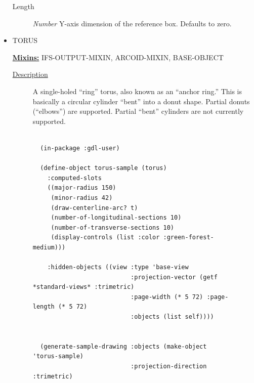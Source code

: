\documentclass [11pt]{book}
\begin{document}
\begin{itemize}
\begin{description}

\item [Length]
\emph{Number} Y-axis dimension of the reference box. Defaults to zero.


\end{description}







\item {}TORUS


\textbf{
\underline{Mixins:}} IFS-OUTPUT-MIXIN, ARCOID-MIXIN, BASE-OBJECT





\begin{description}

\item [
\underline{Description}]


A single-holed ``ring'' torus, also known as an ``anchor ring.''
This is basically a circular cylinder ``bent'' into a donut shape. Partial donuts (``elbows'') are supported.
Partial ``bent'' cylinders are not currently supported.



\end{description}




\begin{figure}
\begin{lrbox}{\boxedverb}
\begin{minipage}{\linewidth}
{\small

\begin{verbatim}
  
  (in-package :gdl-user)
  
  (define-object torus-sample (torus)
    :computed-slots
    ((major-radius 150)
     (minor-radius 42)
     (draw-centerline-arc? t)
     (number-of-longitudinal-sections 10)
     (number-of-transverse-sections 10)
     (display-controls (list :color :green-forest-medium)))

    :hidden-objects ((view :type 'base-view
                           :projection-vector (getf *standard-views* :trimetric)
                           :page-width (* 5 72) :page-length (* 5 72)
                           :objects (list self))))
  

  (generate-sample-drawing :objects (make-object 'torus-sample) 
                           :projection-direction :trimetric)
                  


\end{verbatim}}
\end{minipage}
\end{lrbox}
\end{figure}
\end{itemize}
\end{document}
